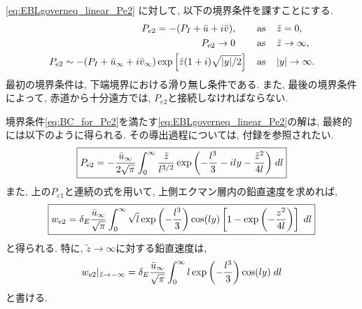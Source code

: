 \eqref{eq:EBLgoverneq_linear_Pe2} に対して, 以下の境界条件を課すことにする. 
\begin{subequations}
 \begin{align}
    P_{e2} = - (P_I + \bar{u} + i\bar{v}), \;\;\;\;\;\;\;\; &{\rm as} \;\;\;\; \tilde{z} = 0, \\
    P_{\rm e2} \to 0 \;\;\;\;\;\;\;\; &{\rm as} \;\;\;\; \tilde{z} \to  \infty, \\
    P_{\rm e2} \sim - (P_I + \bar{u}_\infty + i\bar{v}_\infty) \exp{\left[ \tilde{z} (1+i) \sqrt{|y|/2} \right]}
       \;\;\;\; &{\rm as} \;\;\;\; |y| \to  \infty. 
 \end{align}
\label{eq:BC_for_Pe2}
\end{subequations}
最初の境界条件は, 下端境界における滑り無し条件である. 
また, 最後の境界条件によって, 赤道から十分遠方では, $P_{e2}$と接続しなければならない. 

境界条件\eqref{eq:BC_for_Pe2}を満たす\eqref{eq:EBLgoverneq_linear_Pe2}の解は, 最終的には以下のように得られる. 
その導出過程については, 付録を参照されたい. 
\begin{align}
\boxed{
  P_{\rm e2} = - \dfrac{\bar{u}_\infty}{2\sqrt{\pi}} \int_0^\infty \dfrac{\tilde{z}}{l^{3/2}} 
             \exp{\left( -\dfrac{l^3}{3} - ily - \dfrac{\tilde{z}^2}{4l} \right)} \; dl
}
\end{align}
また, 上の$P_{e1}$と連続の式を用いて, 上側エクマン層内の鉛直速度を求めれば, 
\begin{align}
\boxed{
  w_{\rm e2} = \delta_E \dfrac{\bar{u}_\infty}{\sqrt{\pi}} \int_0^\infty \sqrt{l} \exp \left(-\dfrac{l^3}{3} \right) \cos (ly) 
              \left[ 1 - \exp \left(-\dfrac{z^2}{4l} \right)\right] \; dl
}
\end{align}
と得られる. 
特に, $\tilde{z} \to \infty$に対する鉛直速度は, 
\begin{align}
 w_{\rm e2} |_{\tilde{z} \to - \infty} = \delta_E \dfrac{\bar{u}_\infty}{\sqrt{\pi}}
              \int_0^\infty l \exp \left(-\dfrac{l^3}{3}\right)  \cos(ly) \; dl
\end{align}
と書ける. 

